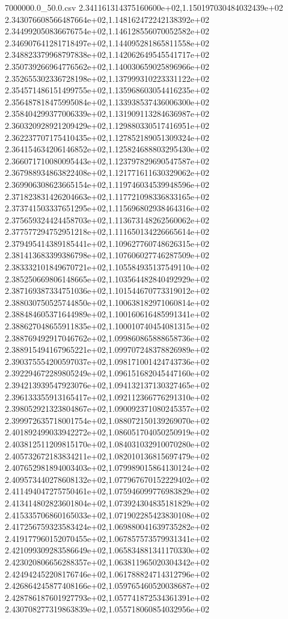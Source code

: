 \begin{filecontents*}{7000000.0_50.0.csv}
2.341161314375160600e+02,1.150197030484032439e+02
2.343076608566487664e+02,1.148162472242138392e+02
2.344992050836676754e+02,1.146128556070052582e+02
2.346907641281718497e+02,1.144095281865811558e+02
2.348823379968797838e+02,1.142062649545541717e+02
2.350739266964776562e+02,1.140030659025896966e+02
2.352655302336728198e+02,1.137999310223331122e+02
2.354571486151499755e+02,1.135968603054416235e+02
2.356487818475995084e+02,1.133938537436006300e+02
2.358404299377006339e+02,1.131909113284636987e+02
2.360320928921209429e+02,1.129880330517416951e+02
2.362237707175410435e+02,1.127852189051309324e+02
2.364154634206146852e+02,1.125824688803295430e+02
2.366071710080095443e+02,1.123797829690547587e+02
2.367988934863822408e+02,1.121771611630329062e+02
2.369906308623665154e+02,1.119746034539948596e+02
2.371823831426204663e+02,1.117721098336833165e+02
2.373741503337651295e+02,1.115696802938464316e+02
2.375659324424458703e+02,1.113673148262560062e+02
2.377577294752951218e+02,1.111650134226665614e+02
2.379495414389185441e+02,1.109627760748626315e+02
2.381413683399386798e+02,1.107606027746287509e+02
2.383332101849670721e+02,1.105584935137549110e+02
2.385250669806148665e+02,1.103564482840492929e+02
2.387169387334751036e+02,1.101544670773319012e+02
2.388030750525744850e+02,1.100638182971060814e+02
2.388484605371644989e+02,1.100160616485991341e+02
2.388627048655911835e+02,1.100010740454081315e+02
2.388769492917046762e+02,1.099860865888658736e+02
2.388915494167965221e+02,1.099707248378826989e+02
2.390375554200597037e+02,1.098171001424743736e+02
2.392294672289805249e+02,1.096151682045447160e+02
2.394213939547923076e+02,1.094132137130327465e+02
2.396133355913165417e+02,1.092112366776291310e+02
2.398052921323804867e+02,1.090092371080245357e+02
2.399972635718001754e+02,1.088072150139269070e+02
2.401892499033942272e+02,1.086051704050250919e+02
2.403812511209815170e+02,1.084031032910070280e+02
2.405732672183834211e+02,1.082010136815697479e+02
2.407652981894003403e+02,1.079989015864130124e+02
2.409573440278608132e+02,1.077967670152229402e+02
2.411494047275750461e+02,1.075946099776983829e+02
2.413414802823601804e+02,1.073924304835181829e+02
2.415335706860165033e+02,1.071902285423830108e+02
2.417256759323583424e+02,1.069880041639735282e+02
2.419177960152070455e+02,1.067857573579931341e+02
2.421099309283586649e+02,1.065834881341170330e+02
2.423020806656288357e+02,1.063811965020304342e+02
2.424942452208176746e+02,1.061788824714312796e+02
2.426864245877408166e+02,1.059765460520038687e+02
2.428786187601927793e+02,1.057741872534361391e+02
2.430708277319863839e+02,1.055718060854032956e+02

\end{filecontents*}
